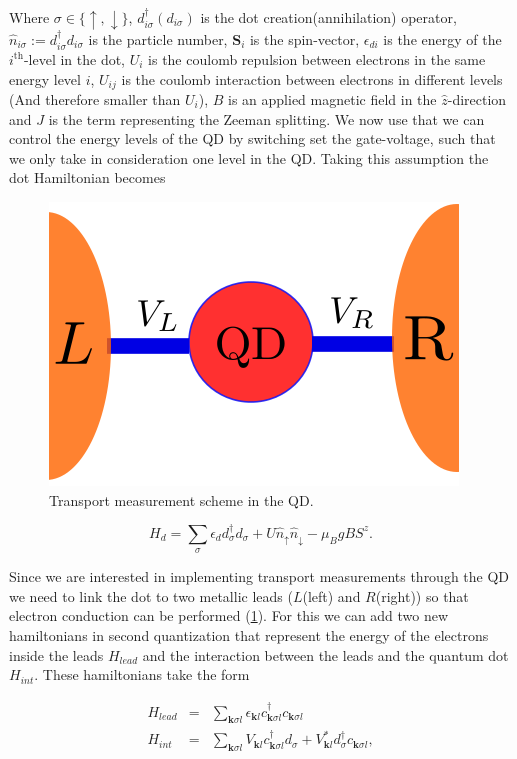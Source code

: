 Where $\sigma\in\{\uparrow,\downarrow\}$, $d_{i\sigma}^{\dagger}\left(d_{i\sigma}\right)$
is the dot creation(annihilation) operator,$\hat{n}_{i\sigma}:=d_{i\sigma}^{\dagger}d_{i\sigma}$
is the particle number, $\mathbf{S}_{i}$ is the spin-vector, $\epsilon_{di}$
is the energy of the $i^{\mbox{th}}$-level in the dot, $U_{i}$ is
the coulomb repulsion between electrons in the same energy level $i$,
$U_{ij}$ is the coulomb interaction between electrons in different
levels (And therefore smaller than $U_{i}$), \textbf{$B$} is an
applied magnetic field in the $\hat{z}$-direction and $J$ is the
term representing the Zeeman splitting. We now use that we can control
the energy levels of the QD by switching set the gate-voltage, such
that we only take in consideration one level in the QD. Taking this
assumption the dot Hamiltonian becomes \\

\begin{figure}[h]
\centering
\includegraphics[scale=0.45]{IMAGES/QD_transport.png}\caption{\label{QD-transport}Transport measurement scheme in the QD. }
\end{figure}


\[
H_{d}=\sum_{\sigma}\epsilon_{d}d_{\sigma}^{\dagger}d_{\sigma}+U\hat{n}_{\uparrow}\hat{n}_{\downarrow}-\mu_{B}gBS^{z}.
\]


Since we are interested in implementing transport measurements through
the QD we need to link the dot to two metallic leads ($L$(left) and
$R$(right)) so that electron conduction can be performed (\ref{QD-transport}).
For this we can add two new hamiltonians in second quantization that
represent the energy of the electrons inside the leads $H_{lead}$
and the interaction between the leads and the quantum dot $H_{int}$.
These hamiltonians take the form 

\begin{eqnarray*}
H_{lead} & = & \sum_{\mathbf{k}\sigma l}\epsilon_{\mathbf{k}l}c_{\mathbf{k}\sigma l}^{\dagger}c_{\mathbf{k}\sigma l}\\
H_{int} & = & \sum_{\mathbf{k}\sigma l}V_{\mathbf{k}l}c_{\mathbf{k}\sigma l}^{\dagger}d_{\sigma}+V_{\mathbf{k}l}^{*}d_{\sigma}^{\dagger}c_{\mathbf{k}\sigma l},
\end{eqnarray*}


